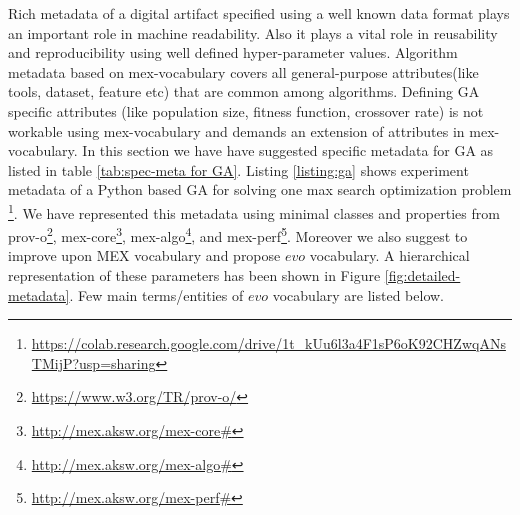 \documentclass[preprint,12pt]{elsarticle}
\begin{document}
Rich metadata of a digital artifact specified using a well known data format plays an important role in machine readability. Also it plays a vital role in reusability and reproducibility using well defined hyper-parameter values. Algorithm metadata based on mex-vocabulary covers all general-purpose attributes(like tools, dataset, feature etc) that are common among algorithms. Defining GA specific attributes (like population size, fitness function, crossover rate) is not workable using mex-vocabulary and demands an extension of attributes in mex-vocabulary.
In this section we have have suggested specific metadata  for GA as listed in table \ref{tab:spec-meta for GA}. Listing \ref{listing:ga} shows experiment metadata of a Python based GA for solving one max search optimization problem \footnote{\url{https://colab.research.google.com/drive/1t_kUu6l3a4F1sP6oK92CHZwqANsTMijP?usp=sharing}}. We have represented this metadata using minimal classes and properties from prov-o\footnote{\url{https://www.w3.org/TR/prov-o/}}, mex-core\footnote{\url{http://mex.aksw.org/mex-core#}}, mex-algo\footnote{\url{http://mex.aksw.org/mex-algo#}}, and mex-perf\footnote{\url{http://mex.aksw.org/mex-perf#}}. %
Moreover we also suggest to improve upon MEX vocabulary and propose $evo$ vocabulary. A hierarchical representation of these parameters has been shown in Figure \ref{fig:detailed-metadata}. Few main terms/entities of $evo$ vocabulary are listed below.  %
\end{document}
